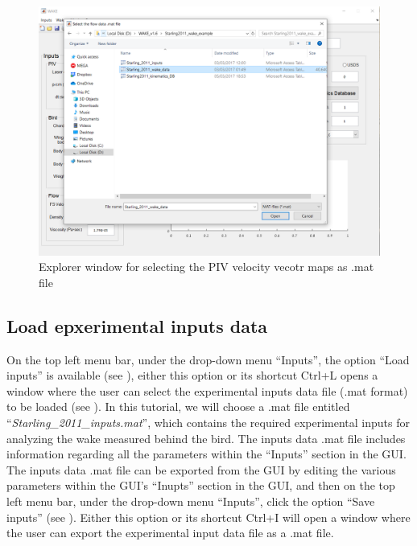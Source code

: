 \documentclass[12pt,a4paper]{article}
\begin{document}
\begin{figure}[ht!]
	\centering
	\includegraphics[width=\textwidth]{explorer_window_wake_data.png}
	\caption{Explorer window for selecting the PIV velocity vecotr maps as .mat file}
	\label{fig:GUI-select_mat_file}
\end{figure}


\subsection{Load epxerimental inputs data}
On the top left menu bar, under the drop-down menu ``Inputs'', the option ``Load inputs'' is available (see ), either this option or its shortcut Ctrl+L opens a window where the user can select the experimental inputs data file (.mat format) to be loaded (see ).
In this tutorial, we will choose a .mat file entitled ``\textit{Starling\_2011\_inputs.mat}'', which contains the required experimental inputs for analyzing the wake measured behind the bird.
The inputs data .mat file includes information regarding all the parameters within the ``Inputs'' section in the GUI.  The inputs data .mat file can be exported from the GUI by editing the various parameters within the GUI's ``Inupts'' section in the GUI, and then on the top left menu bar, under the drop-down menu ``Inputs'', click the option ``Save inputs'' (see ). 
Either this option or its shortcut Ctrl+I will open a window where the user can export the experimental input data file as a .mat file.
\end{document}
